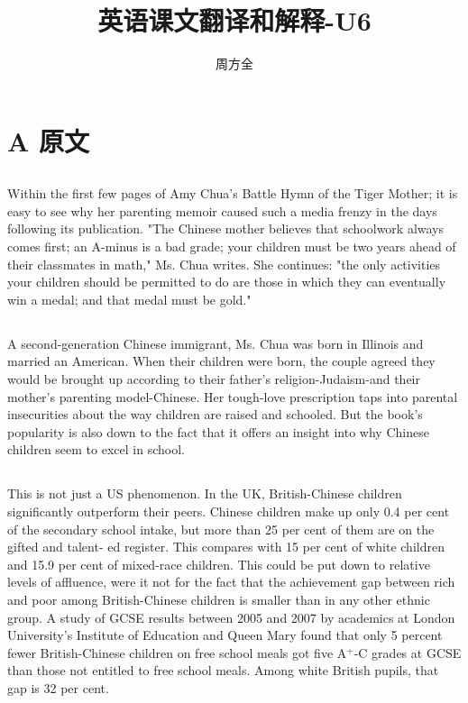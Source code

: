 \documentclass[]{article}
\title{英语课文翻译和解释-U6}
\author{周方全}
\begin{document}
\maketitle

\section{A 原文}
\begin{spacing}{1.75}
{\Large
	\subsection{}
	Within the first few pages of Amy Chua's Battle Hymn of the Tiger Mother; it is easy to see why her parenting memoir caused such a media frenzy in the days following its publication. "The Chinese mother believes that schoolwork always comes first; an A-minus is a bad grade; your children must be two years ahead of their classmates in math," Ms. Chua writes. She continues: "the only activities your children should be permitted to do are those in which they can eventually win a medal; and that medal must be gold."
	\subsection{}
	A second-generation Chinese immigrant, Ms. Chua was born in Illinois and married an American. When their children were born, the couple agreed they would be brought up according to their father's religion-Judaism-and their mother's parenting model-Chinese. Her tough-love prescription taps into parental insecurities about the way children are raised and schooled. But the book's popularity is also down to the fact that it offers an insight into why Chinese children seem to excel in school.
	\subsection{}
	This is not just a US phenomenon. In the UK, British-Chinese children significantly outperform their peers. Chinese children make up only 0.4 per cent of the secondary school intake, but more than 25 per cent of them are on the gifted and talent- ed register. This compares with 15 per cent of white children and 15.9 per cent of mixed-race children. This could be put down to relative levels of affluence, were it not for the fact that the achievement gap between rich and poor among British-Chinese children is smaller than in any other ethnic group. A study of GCSE results between 2005 and 2007 by academics at London University's Institute of Education and Queen Mary found that only 5 percent fewer British-Chinese children on free school meals got five A$^+$-C grades at GCSE than those not entitled to free school meals. Among white British pupils, that gap is 32 per cent.
}
\end{spacing}
\end{document}
